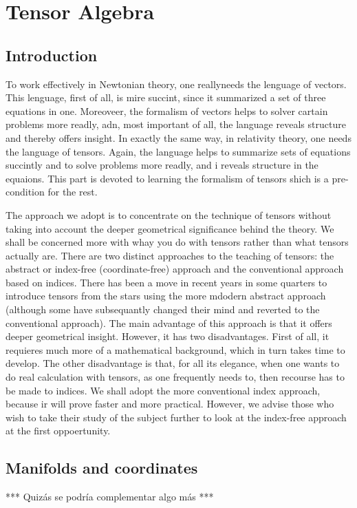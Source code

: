 \chapter{Tensor Algebra}
\section{Introduction}
To work effectively in Newtonian theory, one reallyneeds the lenguage of vectors. This lenguage, first of all, is mire succint, since it  summarized a set of three equations in one. Moreoveer, the formalism of vectors helps to solver cartain problems more readly, adn, most important of all, the language reveals structure and thereby offers insight. In exactly the same way, in relativity theory, one needs the language of tensors. Again, the language helps to summarize sets of equations succintly and to solve problems more readly, and i reveals structure in the equaions. This part is devoted to learning the formalism of tensors shich is a pre-condition for the rest.

The approach we adopt is to concentrate on the technique of tensors without taking into account the deeper geometrical significance behind the theory. We shall be concerned more with whay you do with tensors rather than what tensors actually are. There are two distinct approaches to the teaching of tensors: the abstract or index-free (coordinate-free) approach and the conventional approach based on indices. There has been a move in recent years in some quarters to introduce tensors from the stars using the more mdodern abstract approach (although some have subsequantly changed their mind and reverted to the conventional approach). The main advantage of this approach is that it offers deeper geometrical insight. However, it has two disadvantages. First of all, it requieres much more of a mathematical background, which in turn takes time to develop. The other disadvantage is that, for all its elegance, when one wants to do real calculation with tensors, as one frequently needs to, then recourse has to be made to indices. We shall adopt the more conventional index approach, because ir will prove faster and more practical. However, we advise those who wish to take their study of the subject further to look at the index-free approach at the first oppoertunity.

\section{Manifolds and coordinates}
*** Quizás se podría complementar algo más ***


